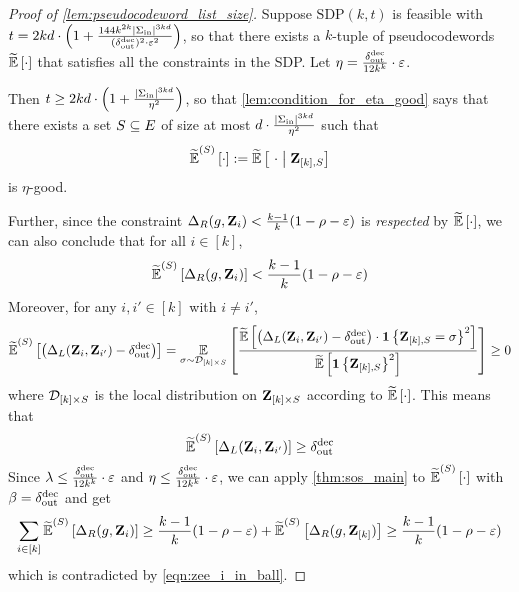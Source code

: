 \begin{proof}[Proof of \cref{lem:pseudocodeword_list_size}]
	Suppose $\mathrm{SDP}(k,t)$ is feasible with $t = 2kd\cdot \left(1+\frac{144k^{2k}|\Sigma_{\mathrm{in}}|^{3kd}}{(\delta_{\mathrm{out}}^{\mathrm{dec}})^2\cdot \varepsilon^2}\right)$, so that there exists a $k$-tuple of pseudocodewords $\tildeEx{\cdot}$ that satisfies all the constraints in the SDP. 
	Let $\eta = \frac{\delta_{\mathrm{out}}^{\mathrm{dec}}}{12k^k} \cdot \varepsilon$.
	
	 Then $t\geq 2kd\cdot \left(1+\frac{|\Sigma_{\mathrm{in}}|^{3kd}}{\eta^2}\right)$, so that \cref{lem:condition_for_eta_good} says that there exists a set $S \subseteq E$ of size at most $d\cdot \frac{|\Sigma_{\mathrm{in}}|^{3kd}}{\eta^2}$ such that \[\pcod{S}{\cdot} \defeq \tildeEx{~\cdot \given \zee_{[k],S}} \] is $\eta$-good.
	
	Further, since the constraint $\Delta_R(g,{ \mathbf{Z} }_i) < \frac{k-1}{k}(1-\rho-\varepsilon)$ is \emph{respected} by $\tildeEx{\cdot}$, we can also conclude that for all $i\in [k]$,
	\begin{align}\label{eqn:zee_i_in_ball}
		\widetilde{\operatorname*{\mathbb{E}}}^{(S)}\left[ \Delta_R(g,{ \mathbf{Z} }_i) \right] < \frac{k-1}{k}(1-\rho-\varepsilon)
	\end{align}
	Moreover, for any $i,i'\in [k]$ with $i\neq i'$,
	\[
		\pcod{S}{\inparen{\Delta_L(\zee_i,\zee_{i'}) - \delta_{\out}^{\dec}}} = \Ex{\sigma \sim \calD_{[k]\times S}}{\frac{\tildeEx{ \inparen{\Delta_L(\zee_i,\zee_{i'}) - \delta_{\out}^{\dec}} \cdot \indi{\zee_{[k], S} = \sigma}^2}}{\tildeEx{\indi{\zee_{[k], S}}^2}}} \geq 0
	\]
	where ${\mathcal D}_{[k]\times S}$ is the local distribution on ${ \mathbf{Z} }_{[k]\times S}$ according to $\tildeEx{\cdot}$. This means that
	\[
		\widetilde{\operatorname*{\mathbb{E}}}^{(S)}\left[ \Delta_L({ \mathbf{Z} }_i,{ \mathbf{Z} }_{i'}) \right] \geq \delta_{\mathrm{out}}^{\mathrm{dec}}
	\]
	Since $\lambda \leq \frac{\delta_{\mathrm{out}}^{\mathrm{dec}}}{12k^k} \cdot \varepsilon$ and $\eta \leq \frac{\delta_{\mathrm{out}}^{\mathrm{dec}}}{12k^k} \cdot \varepsilon$, we can apply \cref{thm:sos_main} to $\widetilde{\operatorname*{\mathbb{E}}}^{(S)}\left[ \cdot \right]$ with $\beta = \delta_{\mathrm{out}}^{\mathrm{dec}}$ and get
	\[
		\sum_{i\in [k]} \widetilde{\operatorname*{\mathbb{E}}}^{(S)}\left[ \Delta_R(g,{ \mathbf{Z} }_i) \right] \geq \frac{k-1}{k}(1-\rho-\varepsilon) + \widetilde{\operatorname*{\mathbb{E}}}^{(S)}\left[ \Delta_R(g,{ \mathbf{Z} }_{[k]}) \right] \geq \frac{k-1}{k}(1-\rho-\varepsilon)
	\]
	which is contradicted by \cref{eqn:zee_i_in_ball}.
\end{proof}

